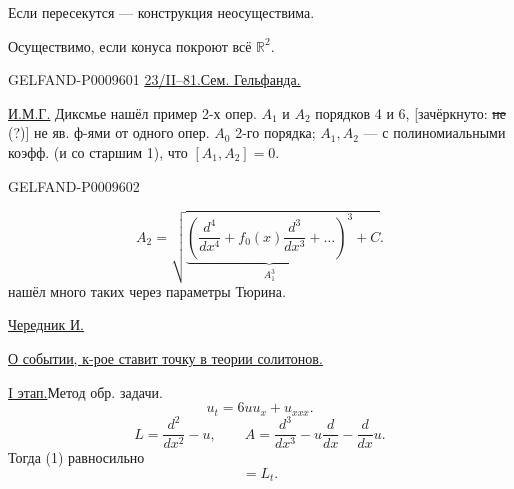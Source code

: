 Если пересекутся --- конструкция неосуществима.

Осуществимо, если конуса покроют всё $\mathbb R^2$.

\begin{GelfandAdjacentEvidence}{GELFAND-P000960}{1}
\underline{\underline{23/\underline{II}--81.}}\quad \underline{Сем. Гельфанда.}

\underline{И.М.Г.} Диксмье нашёл пример 2-х опер. $A_1$ и $A_2$ порядков 4 и 6,
[зачёркнуто: \sout{не} (?)] не яв. ф-ями от одного опер. $A_0$ 2-го порядка; $A_1,A_2$ --- с полиномиальными коэфф. (и со старшим 1), что $[A_1,A_2]=0$.
\end{GelfandAdjacentEvidence}
\begin{GelfandAdjacentEvidence}{GELFAND-P000960}{2}

\[
 A_2=\sqrt{\underbrace{\left(\frac{d^4}{dx^4}
 +f_0(x)\frac{d^3}{dx^3}+\ldots\right)^3}_{A_1^3}+C}.
\]
 нашёл много таких через параметры Тюрина.

\underline{Чередник И.}

\underline{О событии, к-рое ставит точку в теории солитонов.}

\underline{I этап.}\quad Метод обр. задачи.
\begin{equation*}
 u_t=6uu_x+u_{xxx}.\tag{1}
\end{equation*}
\begin{equation*}
 L=\frac{d^2}{dx^2}-u,\qquad
 A=\frac{d^3}{dx^3}-u\frac{d}{dx}-\frac{d}{dx}u.\tag{2}
\end{equation*}
Тогда (1) равносильно
\begin{equation*}
 [L,A]=L_t.\tag{3}
\end{equation*}
\end{GelfandAdjacentEvidence}
